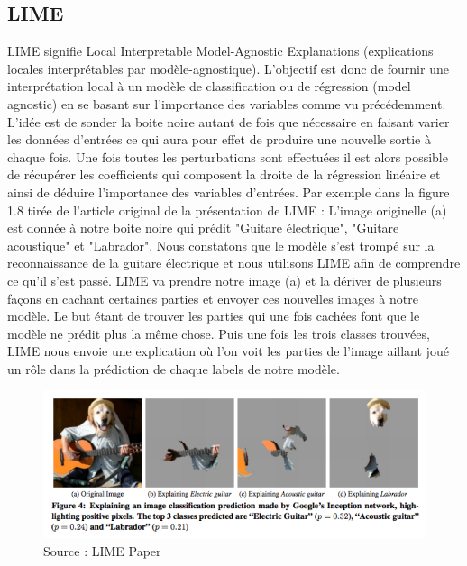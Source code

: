 \subsection{LIME}
LIME signifie Local Interpretable Model-Agnostic Explanations (explications locales interprétables par modèle-agnostique). L'objectif est donc de fournir une interprétation local à un modèle de classification ou de régression (model agnostic) en se basant sur l’importance des variables comme vu précédemment. L'idée est de sonder la boite noire autant de fois que nécessaire en faisant varier les données d'entrées ce qui aura pour effet de produire une nouvelle sortie à chaque fois. Une fois toutes les perturbations sont effectuées il est alors possible de récupérer les coefficients qui composent la droite de la régression linéaire et ainsi de déduire l'importance des variables d'entrées. Par exemple dans la figure 1.8 tirée de l'article original de la présentation de LIME\cite{limePaper} : L'image originelle (a) est donnée à notre boite noire qui prédit "Guitare électrique", "Guitare acoustique" et "Labrador". Nous constatons que le modèle s'est trompé sur la reconnaissance de la guitare électrique et nous utilisons LIME afin de comprendre ce qu'il s'est passé. LIME va prendre notre image (a) et la dériver de plusieurs façons en cachant certaines parties et envoyer ces nouvelles images à notre modèle. Le but étant de trouver les parties qui une fois cachées font que le modèle ne prédit plus la même chose. Puis une fois les trois classes trouvées, LIME nous envoie une explication où l'on voit les parties de l'image aillant joué un rôle dans la prédiction de chaque labels de notre modèle.
\begin{figure}[h]
\centering
\includegraphics[scale=0.35]{src_img/limeExemple.png}
\caption{Source : LIME Paper}
\label{limeExemple}
\end{figure}

